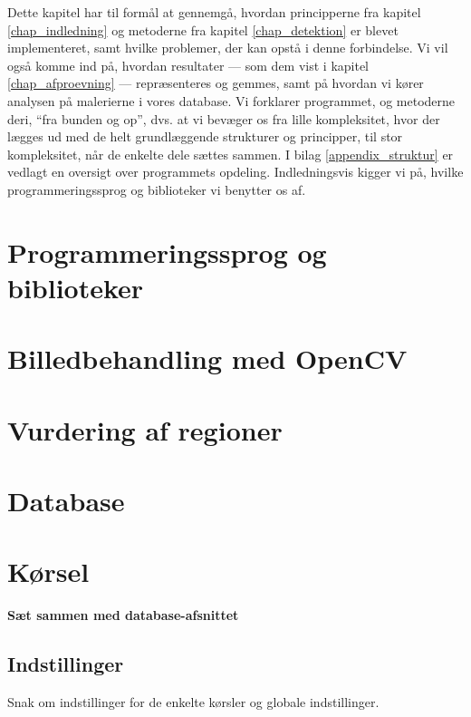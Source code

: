 {
{\sffamily Dette kapitel har til formål at gennemgå, hvordan
principperne fra kapitel \ref{chap_indledning} og metoderne fra kapitel
\ref{chap_detektion} er blevet implementeret, samt hvilke problemer, der
kan opstå i denne forbindelse. Vi vil også komme ind på, hvordan
resultater --- som dem vist i kapitel \ref{chap_afproevning} ---
repræsenteres og gemmes, samt på hvordan vi kører analysen på malerierne
i vores database.  Vi forklarer programmet, og metoderne deri, ``fra
bunden og op'', dvs. at vi bevæger os fra lille kompleksitet, hvor der
lægges ud med de helt grundlæggende strukturer og principper, til stor
kompleksitet, når de enkelte dele sættes sammen.  I bilag
\ref{appendix_struktur} er vedlagt en oversigt over programmets opdeling.
Indledningsvis kigger vi på, hvilke programmeringssprog og biblioteker
vi benytter os af.
}

\section{Programmeringssprog og biblioteker\label{section_programmeringssprog}}


\section{Billedbehandling med OpenCV\label{section_impBilledbehandling}}


\section{Vurdering af regioner\label{section_vurdering_regioner}}


\section{Database\label{section_imp_database}}


\section{Kørsel\label{section_koersel}}
\textbf{Sæt sammen med database-afsnittet}\\

\subsection{Indstillinger}
Snak om indstillinger for de enkelte kørsler og globale indstillinger.

}

